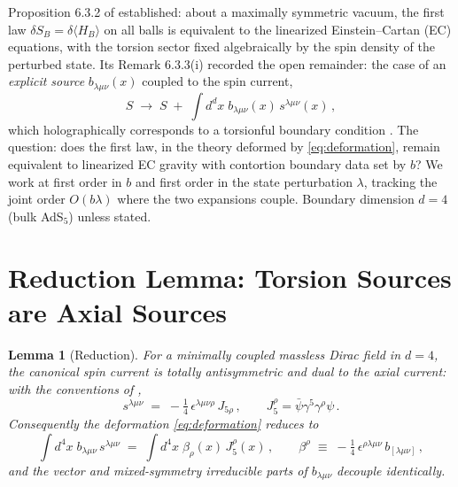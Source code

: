\documentclass[11pt]{article}
\newtheorem{lemma}[theorem]{Lemma}
\theoremstyle{definition}
\begin{document}
Proposition 6.3.2 of \cite{McGwier2026} established: about a maximally
symmetric vacuum, the first law $\delta S_B=\delta\langle H_B\rangle$ on all
balls is equivalent to the linearized Einstein--Cartan (EC) equations, with
the torsion sector fixed algebraically by the spin density of the perturbed
state. Its Remark 6.3.3(i) recorded the open remainder: the case of an
\emph{explicit source} $b_{\lambda\mu\nu}(x)$ coupled to the spin current,
\begin{equation}
S \;\longrightarrow\; S \;+\; \int d^dx\;
b_{\lambda\mu\nu}(x)\, s^{\lambda\mu\nu}(x)\,,
\label{eq:deformation}
\end{equation}
which holographically corresponds to a torsionful boundary condition
\cite{GallegosGursoy2020,GGY2021}. The question: does the first law, in the
theory deformed by \eqref{eq:deformation}, remain equivalent to linearized
EC gravity with contortion boundary data set by $b$? We work at first order
in $b$ and first order in the state perturbation $\lambda$, tracking the
joint order $O(b\lambda)$ where the two expansions couple. Boundary
dimension $d=4$ (bulk AdS$_5$) unless stated.

\section{Reduction Lemma: Torsion Sources are Axial Sources}

\begin{lemma}[Reduction]
\label{lem:reduction}
For a minimally coupled massless Dirac field in $d=4$, the canonical spin
current is totally antisymmetric and dual to the axial current: with the
conventions of \cite{HehlDatta1971,HehlRMP1976},
\begin{equation}
s^{\lambda\mu\nu} \;=\; -\tfrac{1}{4}\,\epsilon^{\lambda\mu\nu\rho}\,
J_{5\rho}\,,\qquad J_5^\rho=\bar\psi\gamma^5\gamma^\rho\psi\,.
\label{eq:dualspin}
\end{equation}
Consequently the deformation \eqref{eq:deformation} reduces to
\begin{equation}
\int d^4x\; b_{\lambda\mu\nu}\,s^{\lambda\mu\nu}
\;=\;\int d^4x\;\beta_\rho(x)\,J_5^\rho(x)\,,\qquad
\beta^\rho \;\equiv\; -\tfrac{1}{4}\,\epsilon^{\rho\lambda\mu\nu}\,
b_{[\lambda\mu\nu]}\,,
\label{eq:axialreduction}
\end{equation}
and the vector and mixed-symmetry irreducible parts of
$b_{\lambda\mu\nu}$ decouple identically.
\end{lemma}
\end{document}
